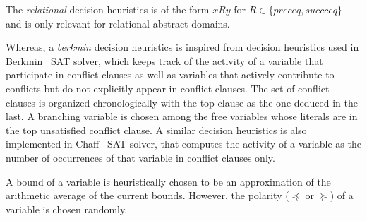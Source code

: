 The {\em relational} decision heuristics is of the form 
$x R y$ for $R \in \{preceq, succceq\}$ and is only relevant for relational 
abstract domains.  

Whereas, a {\em berkmin} decision heuristics is inspired 
from decision heuristics used in Berkmin~\cite{eugoldberg07} SAT solver, which 
keeps track of the activity of a variable that participate in conflict clauses 
as well as variables that actively contribute to conflicts but do not explicitly 
appear in conflict clauses.  The set of conflict clauses is organized 
chronologically with the top clause as the one deduced in the last.  A 
branching variable is chosen among the free variables whose literals are 
in the top unsatisfied conflict clause.  A similar decision heuristics is 
also implemented in Chaff~\cite{chaff} SAT solver, that computes the activity 
of a variable as the number of occurrences of that variable in conflict 
clauses only. 

A bound of a variable  is heuristically chosen to be an approximation of the 
arithmetic average of the current bounds.  However, the polarity ($\preceq$ or
$\succeq$) of a variable is chosen randomly.  
